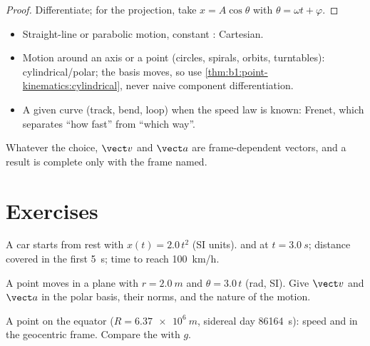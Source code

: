 \begin{proof}
Differentiate; for the projection, take $x = A\cos\theta$ with $\theta =
\omega t + \varphi$.
\end{proof}

\begin{method}\label{met:b1:point-kinematics:choose}
\begin{itemize}
  \item Straight-line or parabolic motion, constant :
        Cartesian.
  \item Motion around an axis or a point (circles, spirals, orbits,
        turntables): cylindrical/polar; the basis moves, so use
        \cref{thm:b1:point-kinematics:cylindrical}, never naive
        component differentiation.
  \item A given curve (track, bend, loop) when the speed law is known:
        Frenet, which separates ``how fast'' from ``which way''.
\end{itemize}
Whatever the choice, $\vect v$ and $\vect a$ are frame-dependent
vectors, and a result is complete only with the frame named.
\end{method}

\section{Exercises}

\begin{exercise}[$\star$]\label{exo:b1:point-kinematics:1}
A car starts from rest with $x(t) = 2.0\,t^2$ (SI units).  and
 at $t = \qty{3.0}{s}$; distance covered in the first
\qty{5}{s}; time to reach \qty{100}{km/h}.
\end{exercise}

\begin{exercise}[$\star$]\label{exo:b1:point-kinematics:2}
A point moves in a plane with $r = \qty{2.0}{m}$ and $\theta = 3.0\,t$
(rad, SI). Give $\vect v$ and $\vect a$ in the polar basis, their norms,
and the nature of the motion.
\end{exercise}

\begin{exercise}[$\star$]\label{exo:b1:point-kinematics:3}
A point on the equator ($R = \qty{6.37e6}{m}$, sidereal day
\qty{86164}{s}): speed and  in the geocentric frame.
Compare the  with $g$.
\end{exercise}

